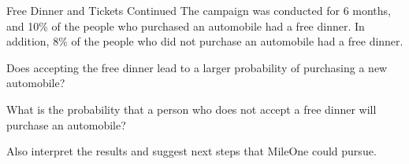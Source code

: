 \documentclass[pdf]{beamer}
\theoremstyle{remark}
\theoremstyle{definition}
\begin{document}
\begin{frame}[t]{Free Dinner and Tickets Continued}
The campaign was conducted for 6 months, and 10\% of the people who purchased an automobile had a free dinner. In addition, 8\% of the people who did not purchase an automobile had a free dinner. \\
\vspace{1.0ex}
\begin{description}
\item [Question 1] Does accepting the free dinner lead to a larger probability of purchasing a new automobile?
\item [Question 2] What is the probability that a person who does not accept a free dinner will purchase
an automobile?
\item Also interpret the results and suggest next steps that MileOne could pursue.
\end{description}
\end{frame}
\end{document}
